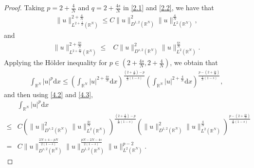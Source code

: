 \documentclass[12pt,a4paper,reqno]{amsart}
\numberwithin{equation}{section}
\begin{document}
\begin{proof}
Taking $p=2+\frac{4}{N}$ and  $q=2+\frac{4s}{N}$ in \eqref{2.1} and \eqref{2.2},
we have that
\begin{equation}\label{4.2}
\begin{aligned}
\|u\|_{L^{2+\frac{4}{N}}(\mathbb{R}^{N})}^{2+\frac{4}{N}}
\leqslant
C
\|u\|_{D^{1,2}(\mathbb{R}^{N})}^{2}
\|u\|_{L^{2}(\mathbb{R}^{N})}^{\frac{4}{N}},
\end{aligned}
\end{equation}
and
\begin{equation}\label{4.3}
\begin{aligned}
\|u\|_{L^{2+\frac{4s}{N}}(\mathbb{R}^{N})}^{2+\frac{4s}{N}}
\leqslant&
C
\|u\|_{D^{s,2}(\mathbb{R}^{N})}^{2}
\|u\|_{L^{2}(\mathbb{R}^{N})}^{\frac{4s}{N}}.
\end{aligned}
\end{equation}
Applying the H\"{o}lder inequality for $p\in(2+\frac{4s}{N},2+\frac{4}{N})$,
we obtain that
\begin{equation*}
\begin{aligned}
\int_{\mathbb{R}^{N}}|u|^{p}\mathrm{d}x
\leqslant\left(\int_{\mathbb{R}^{N}}|u|^{2+\frac{4s}{N}}\mathrm{d}x\right)^{\frac{(2+\frac{4}{N})-p}{\frac{4}{N}(1-s)}}
\left(\int_{\mathbb{R}^{N}}|u|^{2+\frac{4}{N}}\mathrm{d}x\right)^{\frac{p-(2+\frac{4s}{N})}{\frac{4}{N}(1-s)}},
\end{aligned}
\end{equation*}
and then using \eqref{4.2} and \eqref{4.3},
\begin{equation*}
\begin{aligned}
&\int_{\mathbb{R}^{N}}|u|^{p}\mathrm{d}x\\
\leqslant&C
\left(\|u\|_{D^{s,2}(\mathbb{R}^{N})}^{2}
\|u\|_{L^{2}(\mathbb{R}^{N})}^{\frac{4s}{N}}
\right)^{\frac{(2+\frac{4}{N})-p}{\frac{4}{N}(1-s)}}
\left(\|u\|_{D^{1,2}(\mathbb{R}^{N})}^{2}
\|u\|_{L^{2}(\mathbb{R}^{N})}^{\frac{4}{N}}\right)^{\frac{p-(2+\frac{4s}{N})}{\frac{4}{N}(1-s)}}\\
=&C
\|u\|_{D^{s,2}(\mathbb{R}^{N})}^{\frac{2N+4-pN}{2(1-s)}}
\|u\|_{D^{1,2}(\mathbb{R}^{N})}^{\frac{pN-2N-4s}{2(1-s)}}
\|u\|_{L^{2}(\mathbb{R}^{N})}^{p-2}.
\end{aligned}
\end{equation*}
\end{proof}
\end{document}
